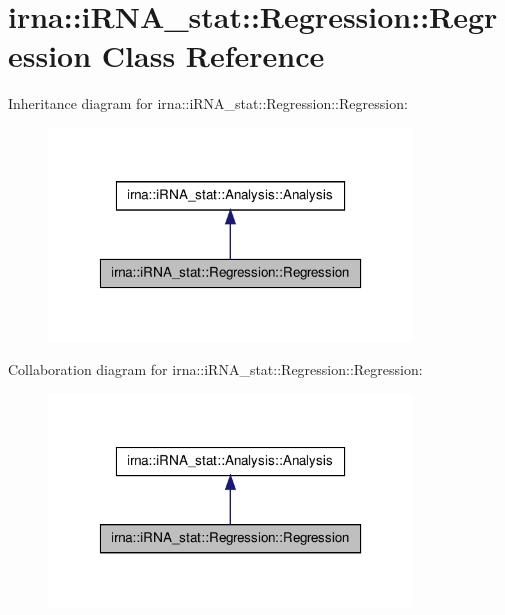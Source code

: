 \hypertarget{classirna_1_1iRNA__stat_1_1Regression_1_1Regression}{
\section{irna\-:\-:i\-R\-N\-A\-\_\-stat\-:\-:\-Regression\-:\-:\-Regression \-Class \-Reference}
\label{classirna_1_1iRNA__stat_1_1Regression_1_1Regression}
}


\-Inheritance diagram for irna\-:\-:i\-R\-N\-A\-\_\-stat\-:\-:\-Regression\-:\-:\-Regression\-:\nopagebreak
\begin{figure}[H]
\begin{center}
\leavevmode
\includegraphics[width=274pt]{classirna_1_1iRNA__stat_1_1Regression_1_1Regression__inherit__graph}
\end{center}
\end{figure}


\-Collaboration diagram for irna\-:\-:i\-R\-N\-A\-\_\-stat\-:\-:\-Regression\-:\-:\-Regression\-:\nopagebreak
\begin{figure}[H]
\begin{center}
\leavevmode
\includegraphics[width=274pt]{classirna_1_1iRNA__stat_1_1Regression_1_1Regression__coll__graph}
\end{center}
\end{figure}

